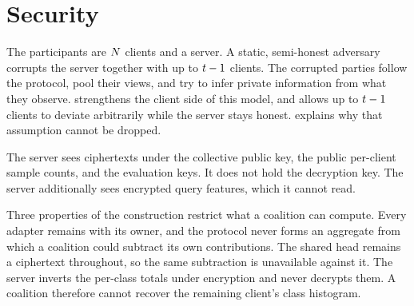 \section{Security}
\label{sec:security}

\label{sec:threat}

The participants are $N$ clients and a server. A static, semi-honest adversary
corrupts the server together with up to $t-1$ clients. The corrupted parties
follow the protocol, pool their views, and try to infer private information from
what they observe. 
strengthens the client side of this model, and allows up to $t-1$ clients to
deviate arbitrarily while the server stays honest. 
explains why that assumption cannot be dropped.



The server sees ciphertexts under the collective public key, the
public per-client sample counts, and the evaluation keys. It does not hold the decryption
key. The server additionally sees
encrypted query features, which it cannot read.

Three properties of the construction restrict what a coalition can compute.
Every adapter remains with its owner, and the protocol never forms an aggregate
from which a coalition could subtract its own contributions. The shared head
remains a ciphertext throughout, so the same subtraction is unavailable against
it. The server inverts the per-class totals under encryption and never decrypts
them. A coalition therefore cannot recover the remaining client's class
histogram.


